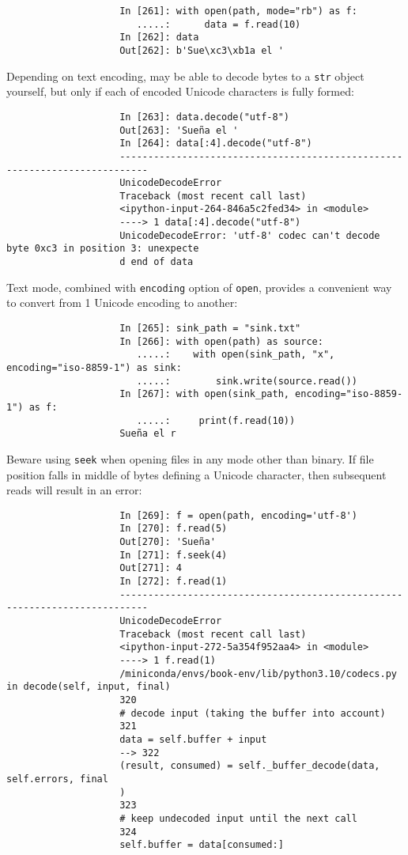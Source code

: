 \documentclass{article}
\begin{document}
\begin{enumerate}
\begin{itemize}
\begin{itemize}
\begin{itemize}
				\begin{verbatim}
					In [261]: with open(path, mode="rb") as f:
					   .....:      data = f.read(10)
				    In [262]: data
				    Out[262]: b'Sue\xc3\xb1a el '
				\end{verbatim}
				Depending on text encoding, may be able to decode bytes to a {\tt str} object yourself, but only if each of encoded Unicode characters is fully formed:
				\begin{verbatim}
					In [263]: data.decode("utf-8")
					Out[263]: 'Sueña el '
					In [264]: data[:4].decode("utf-8")
					---------------------------------------------------------------------------
					UnicodeDecodeError
					Traceback (most recent call last)
					<ipython-input-264-846a5c2fed34> in <module>
					----> 1 data[:4].decode("utf-8")
					UnicodeDecodeError: 'utf-8' codec can't decode byte 0xc3 in position 3: unexpecte
					d end of data
				\end{verbatim}
				Text mode, combined with {\tt encoding} option of {\tt open}, provides a convenient way to convert from 1 Unicode encoding to another:
				\begin{verbatim}
					In [265]: sink_path = "sink.txt"
					In [266]: with open(path) as source:
					   .....:    with open(sink_path, "x", encoding="iso-8859-1") as sink:
					   .....:        sink.write(source.read())
			        In [267]: with open(sink_path, encoding="iso-8859-1") as f:
			           .....:     print(f.read(10))
			        Sueña el r
				\end{verbatim}
				Beware using {\tt seek} when opening files in any mode other than binary. If file position falls in middle of bytes defining a Unicode character, then subsequent reads will result in an error:
				\begin{verbatim}
					In [269]: f = open(path, encoding='utf-8')
					In [270]: f.read(5)
					Out[270]: 'Sueña'
					In [271]: f.seek(4)
					Out[271]: 4
					In [272]: f.read(1)
					---------------------------------------------------------------------------
					UnicodeDecodeError
					Traceback (most recent call last)
					<ipython-input-272-5a354f952aa4> in <module>
					----> 1 f.read(1)
					/miniconda/envs/book-env/lib/python3.10/codecs.py in decode(self, input, final)
					320
					# decode input (taking the buffer into account)
					321
					data = self.buffer + input
					--> 322
					(result, consumed) = self._buffer_decode(data, self.errors, final
					)
					323
					# keep undecoded input until the next call
					324
					self.buffer = data[consumed:]

\end{verbatim}
\end{itemize}
\end{itemize}
\end{itemize}
\end{enumerate}
\end{document}
